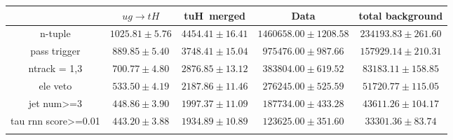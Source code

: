 \begin{tabular}{ccccc} \toprule\toprule
 & $ug\to tH$ & tuH~merged & Data & total background\\\midrule
n-tuple & $1025.81\pm5.76$ & $4454.41\pm16.41$ & $1460658.00\pm1208.58$ & $234193.83\pm261.60$\\
pass trigger & $889.85\pm5.40$ & $3748.41\pm15.04$ & $975476.00\pm987.66$ & $157929.14\pm210.31$\\
ntrack = 1,3 & $700.77\pm4.80$ & $2876.85\pm13.12$ & $383804.00\pm619.52$ & $83183.11\pm158.85$\\
ele veto & $533.50\pm4.19$ & $2187.86\pm11.46$ & $276245.00\pm525.59$ & $51720.77\pm115.05$\\
jet num>=3 & $448.86\pm3.90$ & $1997.37\pm11.09$ & $187734.00\pm433.28$ & $43611.26\pm104.17$\\
tau rnn score>=0.01 & $443.20\pm3.88$ & $1934.89\pm10.89$ & $123625.00\pm351.60$ & $33301.36\pm83.74$\\
\bottomrule\bottomrule\\
\end{tabular}